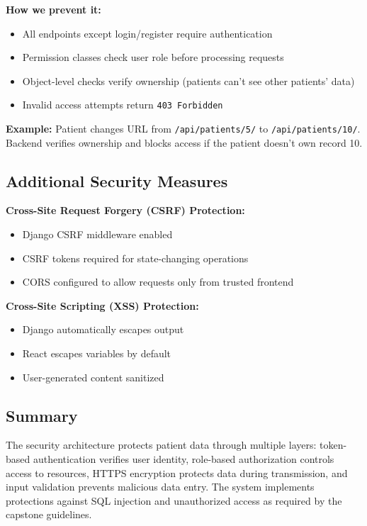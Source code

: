 \documentclass[11pt,a4paper]{article}
\begin{document}
\noindent
\textbf{How we prevent it:}
\begin{itemize}
    \item All endpoints except login/register require authentication
    \item Permission classes check user role before processing requests
    \item Object-level checks verify ownership (patients can't see other patients' data)
    \item Invalid access attempts return \texttt{403 Forbidden}
\end{itemize}

\noindent
\textbf{Example:} Patient changes URL from \texttt{/api/patients/5/} to \texttt{/api/patients/10/}. Backend verifies ownership and blocks access if the patient doesn't own record 10.

\subsection{Additional Security Measures}

\textbf{Cross-Site Request Forgery (CSRF) Protection:}
\begin{itemize}
    \item Django CSRF middleware enabled
    \item CSRF tokens required for state-changing operations
    \item CORS configured to allow requests only from trusted frontend
\end{itemize}
\noindent
\textbf{Cross-Site Scripting (XSS) Protection:}
\begin{itemize}
    \item Django automatically escapes output
    \item React escapes variables by default
    \item User-generated content sanitized
\end{itemize}

\subsection{Summary}

The security architecture protects patient data through multiple layers: token-based authentication verifies user identity, role-based authorization controls access to resources, HTTPS encryption protects data during transmission, and input validation prevents malicious data entry. The system implements protections against SQL injection and unauthorized access as required by the capstone guidelines.
\end{document}
